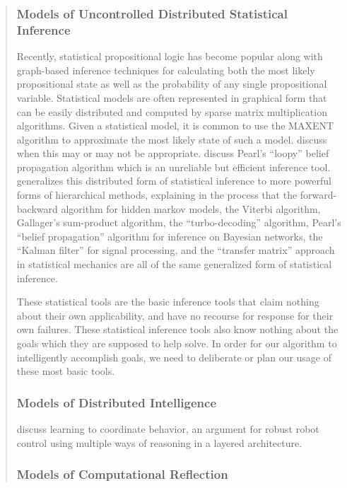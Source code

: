 \begin{quotation}
\subsubsection{Models of Uncontrolled Distributed Statistical Inference}
Recently, statistical propositional logic has become popular along with graph-based inference techniques for calculating both the most likely propositional state as well as the probability of any single propositional variable.
Statistical models are often represented in graphical form that can be easily distributed and computed by sparse matrix multiplication algorithms.
Given a statistical model, it is common to use the MAXENT algorithm to approximate the most likely state of such a model.
\cite{jaynes1982maxent} discuss when this may or may not be appropriate.
\cite{murphy1999lbp} discuss Pearl's ``loopy'' belief propagation algorithm which is an unreliable but efficient inference tool.
\cite{yedidia2005feagbp} generalizes this distributed form of statistical inference to more powerful forms of hierarchical methods, explaining in the process that the forward-backward algorithm for hidden markov models, the Viterbi algorithm, Gallager's sum-product algorithm, the ``turbo-decoding'' algorithm, Pearl's ``belief propagation'' algorithm for inference on Bayesian networks, the ``Kalman filter'' for signal processing, and the ``transfer matrix'' approach in statistical mechanics are all of the same generalized form of statistical inference.

These statistical tools are the basic inference tools that claim nothing about their own applicability, and have no recourse for response for their own failures.
These statistical inference tools also know nothing about the goals which they are supposed to help solve.
In order for our algorithm to intelligently accomplish goals, we need to deliberate or plan our usage of these most basic tools.

\subsubsection{Models of Distributed Intelligence}

\cite{maes1990lcb} discuss learning to coordinate behavior, an argument for robust robot control using multiple ways of reasoning in a layered architecture.

\subsubsection{Models of Computational Reflection}


\end{quotation}
